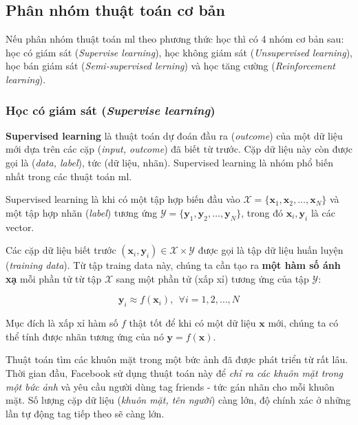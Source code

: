 \documentclass[../main-report.tex]{subfiles}
\begin{document}
\subsection{Phân nhóm thuật toán cơ bản}
Nếu phân nhóm thuật toán \gls{ml} theo phương thức học thì có 4 nhóm cơ bản sau: học có giám sát (\emph{Supervise learning}), học không giám sát (\emph{Unsupervised learning}), học bán giám sát (\emph{Semi-supervised lerning}) và học tăng cường (\emph{Reinforcement learning}).

\subsubsection{Học có giám sát (\emph{Supervise learning})}
\textbf{Supervised learning} là thuật toán dự đoán đầu ra (\emph{outcome}) của một dữ liệu mới dựa trên các cặp (\emph{input, outcome}) đã biết từ trước. Cặp dữ liệu này còn được gọi là (\emph{data, label}), tức (dữ liệu, nhãn). Supervised learning là nhóm phổ biến nhất trong các thuật toán \gls{ml}.

Supervised learning là khi có một tập hợp biến đầu vào $ \mathcal{X} = \{\mathbf{x}_1, \mathbf{x}_2, \dots, \mathbf{x}_N\} $ và một tập hợp nhãn (\emph{label}) tương ứng \( \mathcal{Y} = \{\mathbf{y}_1, \mathbf{y}_2, \dots,\mathbf{y}_N\} \), trong đó \( \mathbf{x}_i, \mathbf{y}_i \) là các vector. 

Các cặp dữ liệu biết trước \( (\mathbf{x}_i, \mathbf{y}_i) \in \mathcal{X} \times \mathcal{Y} \) 
được gọi là tập dữ liệu huấn luyện (\emph{training data}). Từ tập traing data này, chúng ta cần tạo ra \textbf{một hàm số ánh xạ} mỗi phần tử từ tập \(\mathcal{X}\) sang một phần tử (xấp xỉ) tương ứng của tập \(\mathcal{Y}\):

\[ \mathbf{y}_i \approx f(\mathbf{x}_i), ~~ \forall i = 1, 2, \dots, N\] 

Mục đích là xấp xỉ hàm số \(f\) thật tốt để khi có một dữ liệu \(\mathbf{x}\) mới, chúng ta có thể tính được nhãn tương ứng của nó \( \mathbf{y} = f(\mathbf{x}) \).

\begin{example} \label{ex:supervised_learning}
Thuật toán tìm các khuôn mặt trong một bức ảnh đã được phát triển từ rất lâu. Thời gian đầu, Facebook sử dụng thuật toán này để \emph{chỉ ra các khuôn mặt trong một bức ảnh} và yêu cầu người dùng tag friends - tức gán nhãn cho mỗi khuôn mặt. Số lượng cặp dữ liệu (\emph{khuôn mặt, tên người}) càng lớn, độ chính xác ở những lần tự động tag tiếp theo sẽ càng lớn.
\end{example}
\end{document}
